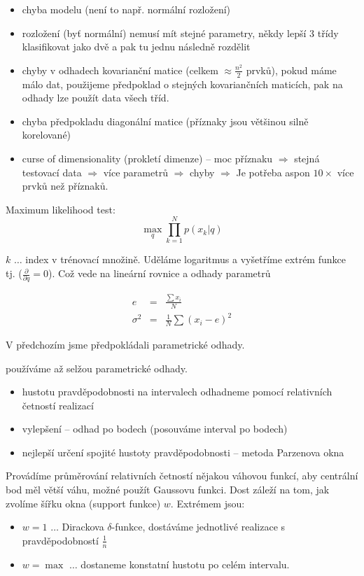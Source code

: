 \begin{itemize}
\item chyba modelu (není to např. normální rozložení)
\item rozložení (byť normální) nemusí mít stejné parametry, někdy lepší 3 třídy klasifikovat jako dvě a pak tu
jednu následně rozdělit
\item chyby v odhadech kovarianční matice (celkem $\approx\frac{n^2}{2}$ prvků), pokud máme málo dat, 
použijeme předpoklad o stejných kovariančních maticích, pak na odhady lze použít data všech tříd.
\item chyba předpokladu diagonální matice (příznaky jsou většinou silně korelované)
\item curse of dimensionality (prokletí dimenze) -- moc příznaku $\Rightarrow$ stejná testovací data $\Rightarrow$ 
více parametrů $\Rightarrow$ chyby $\Rightarrow$ Je potřeba aspon $10\times$ více prvků než příznaků.
\end{itemize}


Maximum likelihood test:
\begin{equation}
\max\limits_q\prod\limits_{k=1}^N p(x_k|q)
\end{equation}

$k$ $\dots$ index v trénovací množině. Uděláme logaritmus a vyšetříme extrém funkce tj. ($\frac{\partial}{\partial q}=0$).
Což vede na lineární rovnice a odhady parametrů

\begin{eqnarray}
e&=&\frac{\sum x_i}{N}\\
\sigma^2&=&\frac{1}{N}\sum(x_i-e)^2
\end{eqnarray}

V předchozím jsme předpokládali parametrické odhady.

 používáme až selžou parametrické odhady.

\begin{itemize}
\item hustotu pravděpodobnosti  na intervalech odhadneme pomocí relativních četností realizací
\item vylepšení -- odhad po bodech (posouváme interval po bodech)
\item nejlepší určení spojité hustoty pravděpodobnosti -- metoda Parzenova okna
\end{itemize}

Provádíme průměrování relativních četností nějakou váhovou funkcí, aby centrální bod měl větší váhu, 
možné použít Gaussovu funkci. Dost záleží na tom, jak zvolíme šířku okna (support funkce)  $w$. Extrémem 
jsou:
\begin{itemize}
\item $w=1$ $\dots$ Dirackova $\delta$-funkce, dostáváme jednotlivé realizace s pravděpodobností $\frac{1}{n}$
\item $w=\max$ $\dots$ dostaneme konstatní hustotu po celém intervalu. 
\end{itemize}

